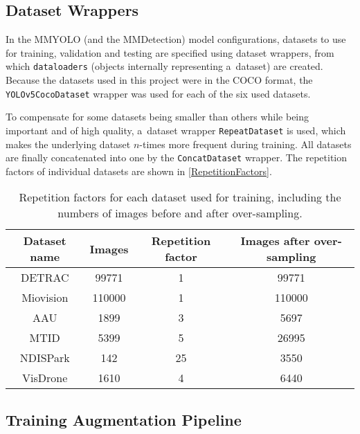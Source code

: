 \subsection{Dataset Wrappers}

In the MMYOLO (and the MMDetection) model configurations, datasets to use for
training, validation and testing are specified using dataset wrappers, from
which \texttt{dataloaders} (objects internally representing a~dataset) are
created. Because the datasets used in this project were in the COCO format, the
\texttt{YOLOv5CocoDataset} wrapper was used for each of the six used datasets.

To compensate for some datasets being smaller than others while being important
and of high quality, a~dataset wrapper \texttt{RepeatDataset} is used, which
makes the underlying dataset $n$-times more frequent during training. All
datasets are finally concatenated into one by the \texttt{ConcatDataset}
wrapper. The repetition factors of individual datasets are shown in
\autoref{RepetitionFactors}.

\begin{table}[t]
    \centering
    \small
    \begin{threeparttable}
        \begin{tabular}{|c|c|c|c|}
            \hline
            Dataset name & Images & Repetition factor & Images after over-sampling \\
            \hline
            DETRAC       &  \num{99771} &  1 & \num{99771} \\
            Miovision    & \num{110000} &  1 & \num{110000} \\
            AAU          &   \num{1899} &  3 & \num{5697} \\
            MTID         &   \num{5399} &  5 & \num{26995} \\
            NDISPark     &    \num{142} & 25 & \num{3550} \\
            VisDrone     &   \num{1610} &  4 & \num{6440} \\
            \hline
        \end{tabular}
        \caption{Repetition factors for each dataset used for training, including the
        numbers of images before and after over-sampling.}
        \label{RepetitionFactors}
    \end{threeparttable}
\end{table}


\subsection{Training Augmentation Pipeline}

